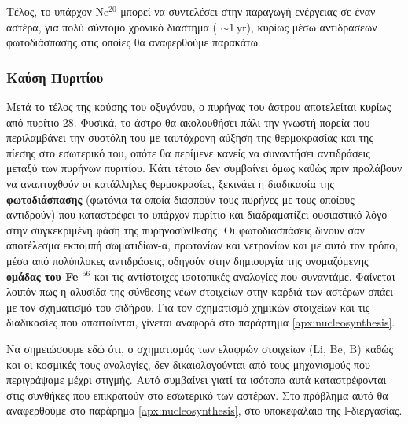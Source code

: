 Τέλος, το υπάρχον Ne$^{20}$ μπορεί να συντελέσει στην παραγωγή ενέργειας σε έναν αστέρα, για πολύ σύντομο χρονικό διάστημα ( $\sim 1 \,\text{yr}$), κυρίως μέσω αντιδράσεων φωτοδιάσπασης στις οποίες θα αναφερθούμε παρακάτω.
\subsubsection{Καύση Πυριτίου}
Μετά το τέλος της καύσης του οξυγόνου, ο πυρήνας του άστρου αποτελείται κυρίως από πυρίτιο-28. Φυσικά, το άστρο θα ακολουθήσει πάλι την γνωστή πορεία που περιλαμβάνει την συστόλη του με ταυτόχρονη αύξηση της θερμοκρασίας και της πίεσης στο εσωτερικό του, οπότε θα περίμενε κανείς να συναντήσει αντιδράσεις μεταξύ των πυρήνων πυριτίου. Κάτι τέτοιο δεν συμβαίνει όμως καθώς πριν προλάβουν να αναπτυχθούν οι κατάλληλες θερμοκρασίες, ξεκινάει η διαδικασία της \textbf{φωτοδιάσπασης} (φωτόνια τα οποία διασπούν τους πυρήνες με τους οποίους αντιδρούν) που καταστρέφει το υπάρχον πυρίτιο και διαδραματίζει ουσιαστικό λόγο στην συγκεκριμένη φάση της πυρηνοσύνθεσης.
Οι φωτοδιασπάσεις δίνουν σαν αποτέλεσμα εκπομπή σωματιδίων-α, πρωτονίων και νετρονίων και με αυτό τον τρόπο, μέσα από πολύπλοκες αντιδράσεις, οδηγούν στην δημιουργία της ονομαζόμενης \textbf{ομάδας του Fe $^{56}$} και τις αντίστοιχες ισοτοπικές αναλογίες που συναντάμε. Φαίνεται λοιπόν πως η αλυσίδα της σύνθεσης νέων στοιχείων στην καρδιά των αστέρων σπάει με τον σχηματισμό του σιδήρου. Για τον σχηματισμό χημικών στοιχείων και τις διαδικασίες που απαιτούνται, γίνεται αναφορά στο παράρτημα \ref{apx:nucleosynthesis}.

Να σημειώσουμε εδώ ότι, ο σχηματισμός των ελαφρών στοιχείων (Li, Be, B) καθώς και οι κοσμικές τους αναλογίες, δεν δικαιολογούνται από τους μηχανισμούς που περιγράψαμε μέχρι στιγμής. Αυτό συμβαίνει γιατί τα ισότοπα αυτά καταστρέφονται στις συνθήκες που επικρατούν στο εσωτερικό των αστέρων. Στο πρόβλημα αυτό θα αναφερθούμε στο παράρημα \ref{apx:nucleosynthesis}, στο υποκεφάλαιο της l-διεργασίας.
